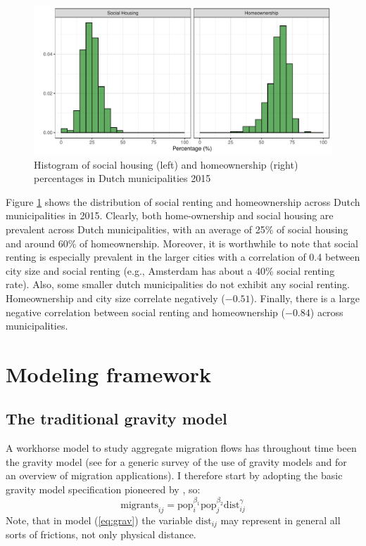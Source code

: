 \documentclass[fleqn,10pt]{SelfArx} %
\begin{document}
        \begin{figure}[ht]\centering %
          \includegraphics[width=0.8\linewidth]{../fig/hist_housing.pdf}
          \caption{Histogram of social housing (left) and
            homeownership (right) percentages in Dutch municipalities
            2015}
            \label{fig:housing_mig}
        \end{figure}

        Figure \ref{fig:housing_mig} shows the distribution of social renting
        and homeownership across Dutch municipalities in 2015.  Clearly, both
        home-ownership and social housing are prevalent across Dutch
        municipalities, with an average of 25\% of social housing and around
        60\% of homeownership. Moreover, it is worthwhile to note that social
        renting is especially prevalent in the larger cities with a correlation
        of 0.4 between city size and social renting (e.g., Amsterdam has about a
        40\% social renting rate). Also, some smaller dutch municipalities do
        not exhibit any social renting. Homeownership and city size correlate
        negatively ($-0.51$). Finally, there is a large negative correlation
        between social renting and homeownership ($-0.84$) across
        municipalities.
        
        \section{Modeling framework}

        \subsection{The traditional gravity model}

        A workhorse model to study aggregate migration flows has throughout time been the gravity model (see \citet{anderson2011gravity} for a generic survey of the use of gravity models and \citet{poot2016gravity} for an overview of migration applications). I therefore start by adopting the basic gravity model specification pioneered by
        \citet{tinbergen1962shaping}, so:
        \begin{equation}
          \text{migrants}_{ij} = \text{pop}_i^{\beta_1}\text{pop}_j^{\beta_2}\text{dist}_{ij}^\gamma
          \label{eq:grav}
        \end{equation}
        Note, that in model (\ref{eq:grav}) the variable
        $\text{dist}_{ij}$ may represent in general all sorts of frictions, not
        only physical distance.
        
\end{document}

